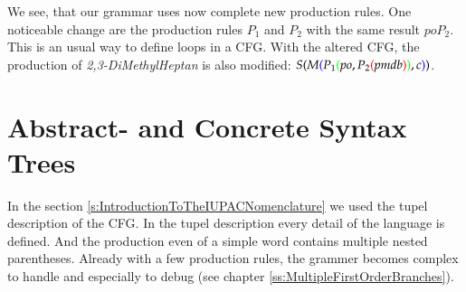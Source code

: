\documentclass[a4paper,10pt]{article}
\newcommand{\colorBracketFirstNesting}{black}
\newcommand{\colorBracketSecondNesting}{blue}
\newcommand{\colorBracketThirdNesting}{green}
\newcommand{\colorBracketFourthNesting}{red}
\begin{document}
We see, that our grammar uses now complete new production rules. One noticeable change are the production rules $P_1$ and $P_2$ with the same result $poP_2$. This is an usual way to define loops in a CFG. With the altered CFG, the production of \emph{2,3-DiMethylHeptan} is also modified:
$
S
{\color{\colorBracketFirstNesting}{(}}
    M
    {\color{\colorBracketSecondNesting}{(}}
        P_1
        {\color{\colorBracketThirdNesting}{(}}
            po,
            P_2
            {\color{\colorBracketFourthNesting}{(}}
                pmdb
            {\color{\colorBracketFourthNesting}{)}}
        {\color{\colorBracketThirdNesting}{)}}
        , c
    {\color{\colorBracketSecondNesting}{)}}
{\color{\colorBracketFirstNesting}{)}}
$.



\section{Abstract- and Concrete Syntax Trees}\label{s:AbstractAndConcreteSyntaxTrees}
In the section \ref{s:IntroductionToTheIUPACNomenclature} we used the tupel description of the CFG. In the tupel description every detail of the language is defined. And the production even of a simple word contains multiple nested parentheses. Already with a few production rules, the grammer becomes complex to handle and especially to debug (see chapter \ref{ss:MultipleFirstOrderBranches}).

\end{document}
